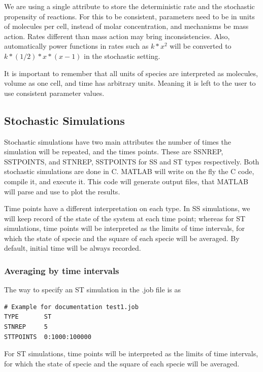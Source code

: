 \documentclass[letterpaper]{article}
\begin{document}
We are using a single attribute to store the deterministic rate and
the stochastic propensity of reactions. For this to be consistent,
parameters need to be in units of molecules per cell, instead of molar
concentration, and mechanisms be mass action. Rates different than
mass action may bring inconsistencies. Also, automatically power
functions in rates such as $k*x^2$ will be converted to $k*(1/2)*x*(x-1)$ in
the stochastic setting.

It is important to remember that all units of species are interpreted
as molecules, volume as one cell, and time has arbitrary
units. Meaning it is left to the user to use consistent parameter
values.

\subsection{Stochastic Simulations}

Stochastic simulations have two main attributes the number of times
the simulation will be repeated, and the times points. These are
SSNREP, SSTPOINTS, and STNREP, SSTPOINTS for SS and ST types
respectively. Both stochastic simulations are done in C. MATLAB will
write on the fly the C code, compile it, and execute it. This code
will generate output files, that MATLAB will parse and use to plot the
results.

Time points have a different interpretation on each type.  In SS
simulations, we will keep record of the state of the system at each
time point; whereas for ST simulations, time points will be
interpreted as the limits of time intervals, for which the state of
specie and the square of each specie will be averaged. By default,
initial time will be always recorded.

\subsubsection{Averaging by time intervals}

The way to specify an ST simulation in the \textsf{.job} file is as
{\footnotesize
\begin{verbatim}
# Example for documentation test1.job
TYPE       ST
STNREP     5
STTPOINTS  0:1000:100000
\end{verbatim}
}
For ST simulations, time points will be interpreted as the limits of
time intervals, for which the state of specie and the square of each
specie will be averaged. 
\end{document}

